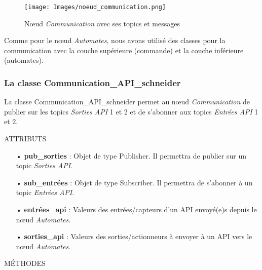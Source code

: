 \documentclass[a4paper,french, titlepage]{book}
\begin{document}
\begin{figure}[H] 
\begin{center}
\texttt{[image: Images/noeud\_communication.png]} 
\end{center}
\caption{Nœud \emph{Communication} avec ses topics et messages}
\label{schema_noeud_communication_topic}
\end{figure}

Comme pour le nœud \emph{Automates}, nous avons utilisé des classes pour la communication avec la couche supérieure (commande) et la couche inférieure (automates).

\subsubsection{La classe Communication\_API\_schneider}

La classe Communication\_API\_schneider permet au nœud \emph{Communication} de publier sur les topics \emph{Sorties API} 1 et 2 et de s'abonner aux topics \emph{Entrées API} 1 et 2.

\begin{center}
ATTRIBUTS
\end{center}

\begin{itemize}
\item[•] \textbf{pub\_sorties} : Objet de type Publisher. Il permettra de publier sur un topic \emph{Sorties API}.
\item[•] \textbf{sub\_entrées} : Objet de type Subscriber. Il permettra de s'abonner à un topic \emph{Entrées API}.
\item[•] \textbf{entrées\_api} : Valeurs des entrées/capteurs d'un API envoyé(e)s depuis le nœud \emph{Automates}.
\item[•] \textbf{sorties\_api} : Valeurs des sorties/actionneurs à envoyer à un API vers le nœud \emph{Automates}.
\end{itemize}

\begin{center}
MÉTHODES
\end{center}
\end{document}
